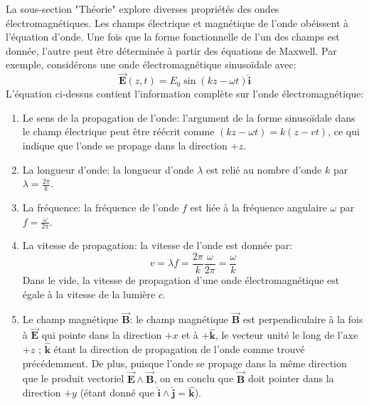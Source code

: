 \documentclass[a4paper]{article}
\begin{document}
La sous-section "Théorie" explore diverses propriétés des ondes électromagnétiques. Les champs électrique et magnétique de l'onde obéissent à l'équation d'onde. Une fois que la forme fonctionnelle de l'un des champs est donnée, l'autre peut être déterminée à partir des équations de Maxwell. Par exemple, considérons une onde électromagnétique sinusoïdale avec: 
\[ \vec{\textbf{E}} (z, t) = E_0 \sin (k z - \omega t) \hat{\textbf{i}} \]
L'équation ci-dessus contient l'information complète sur l'onde électromagnétique: 
\begin{enumerate}
    \item Le sens de la propagation de l'onde: l'argument de la forme sinusoïdale dans le champ électrique peut être réécrit comme 
$ (k z - \omega t) = k (z - v t) $, ce qui indique que l'onde se propage dans la direction $ + z $.
    \item La longueur d'onde: la longueur d'onde $ \lambda $ est relié au nombre d'onde $ k $ par 
$\displaystyle \lambda = \frac{2 \pi}{k} $.
    \item La fréquence: la fréquence de l'onde $ f $ est liée à la fréquence angulaire $ \omega $ par 
$\displaystyle f = \frac{\omega}{2 \pi} $.
    \item La vitesse de propagation: la vitesse de l'onde est donnée par: 
\[ v = \lambda f = \frac{2 \pi}{k} \frac{\omega}{2 \pi} = \frac{\omega}{k} \]
Dans le vide, la vitesse de propagation d'une onde électromagnétique est égale à la vitesse de la lumière $ c $.
    \item Le champ magnétique $ \vec{\textbf{B}} $: le champ magnétique $ \vec{\textbf{B}} $ est perpendiculaire à la fois à 
$ \vec{\textbf{E}} $ qui pointe dans la direction $ + x $ et à $ + \hat{\textbf{k}} $, le vecteur unité le long de l'axe $ + z $ ; $ \hat{\textbf{k}} $ étant la direction de propagation de l'onde comme trouvé précédemment. De plus, puisque l'onde se propage dans la même direction que le produit vectoriel $ \vec{\textbf{E}} \wedge \vec{\textbf{B}} $, on en conclu que $ \vec{\textbf{B}} $ doit pointer dans la direction $ + y $ (étant donné que $ \hat{\textbf{i}} \wedge \hat{\textbf{j}} = \hat{\textbf{k}} $).


\end{enumerate}
\end{document}
